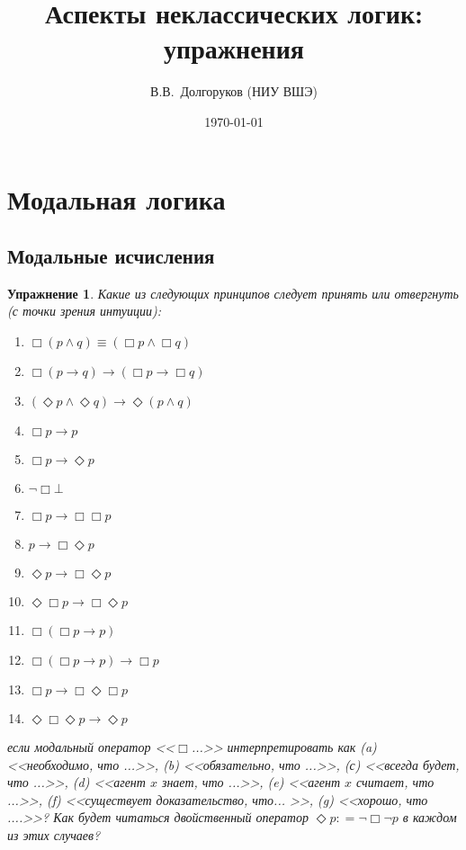 \documentclass[11pt]{article}
\title{Аспекты неклассических логик: упражнения}
\date{\today}
\author{В.В.~Долгоруков (НИУ ВШЭ)}
\newtheorem{exercise}[theorem]{Упражнение}
\begin{document}
\maketitle

\section{Модальная логика}
\subsection{Модальные исчисления}
\begin{exercise} Какие из следующих принципов следует принять или отвергнуть (с точки зрения интуиции):
\begin{multicols}{2}
\begin{enumerate}
\item $\Box (p \wedge q) \equiv (\Box p \wedge \Box q)$
\item $\Box (p \to q) \to (\Box p \to \Box q)$
\item $(\Diamond p \wedge \Diamond q) \to \Diamond (p \wedge q)$
\item $\Box p \to p$
\item $\Box p \to \Diamond p$
\item $\neg \Box \bot$	
\item $\Box p \to \Box \Box p$
\item $p \to \Box \Diamond p$
\item $\Diamond p \to \Box \Diamond p$
\item $\Diamond \Box p \to \Box \Diamond p$
\item $\Box (\Box p \to p)$
\item $\Box (\Box p \to p) \to \Box p$
\item $\Box p \to \Box \Diamond \Box p$
 \item $\Diamond \Box \Diamond p \to \Diamond p$
\end{enumerate}
\end{multicols}

если модальный оператор <<$\Box$...>> интерпретировать как
 (a) <<необходимо, что ...>>, (b) <<обязательно, что ...>>, (с) <<всегда будет, что ...>>, (d) <<агент $x$ знает, что ...>>, (e) <<агент $x$ считает, что ...>>, (f) <<существует доказательство, что... >>, (g) <<хорошо, что ....>>? Как будет читаться двойственный оператор $\Diamond p: = \neg \Box \neg p$ в каждом из этих случаев?
\end{exercise}
\end{document}

